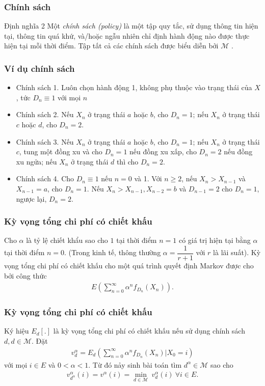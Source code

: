 \documentclass[12pt]{beamer}
\begin{document}
\begin{frame}
	\frametitle{Chính sách}
	\begin{block}{Định nghĩa 2}
		 Một \textit{chính sách (policy)} là một tập quy tắc, sử dụng thông tin hiện tại, thông tin quá khứ, và/hoặc ngẫu nhiên chỉ định hành động nào được thực hiện tại mỗi thời điểm. Tập tất cả các chính sách được biểu diễn bởi  $\mathcal{M}$ .
	\end{block}



\end{frame}

\begin{frame}
	\frametitle{Ví dụ chính sách}
	\begin{itemize}
	  \item	
		Chính sách 1. Luôn chọn hành động 1, không phụ thuộc vào trạng thái của $X$, tức $D_n \equiv 1$ với mọi $n$
		
  \item
		Chính sách 2. Nếu $X_n$ ở trạng thái $a$ hoặc $b$, cho $D_n=1$; nếu $X_n$ ở trạng thái $c$ hoặc $d$, cho $D_n=2$.
		
	  \item
		Chính sách 3. Nếu $X_n$ ở trạng thái $a$ hoặc $b$, cho $D_n=1$; nếu $X_n$ ở trạng thái $c$, tung một đồng xu và cho $D_n=1$ nếu đồng xu xấp, cho $D_n=2$ nếu đồng xu ngửa; nếu $X_n$ ở trạng thái $d$ thì cho $D_n=2$.
		
        \item
		Chính sách 4. Cho $D_n\equiv1$ nếu $n=0$ và 1. Với $n \geq 2$, nếu $X_{n}>X_{n-1}$ và $X_{n-1}=a$, cho $D_n=1$. Nếu $X_n>X_{n-1}, X_{n-2}=b$ và $D_{n-1}=2$ cho $D_n=1$, ngược lại, $D_n=2$.
	\end{itemize}
\end{frame}


\begin{frame}
	\frametitle{Kỳ vọng tổng chi phí có chiết khấu} 
	Cho $\alpha$ là tỷ lệ chiết khẩu sao cho $1$ tại thời điểm $n=1$ có giá trị hiện tại bằng $\alpha$ tại thời điểm $n=0$. (Trong kinh tế, thông thường $\alpha=\dfrac{1}{r+1}$ với $r$ là lãi suất). Kỳ vọng tổng chi phí có chiết khấu cho một quá trình quyết định Markov được cho bởi công thức 
	\begin{align*}
	E(\sum_{n=0}^{\infty}\alpha^n f_{D_n}(X_n)).
	\end{align*} 
\end{frame}

\begin{frame}
	\frametitle{Kỳ vọng tổng chi phí có chiết khấu} 
	 Ký hiệu $E_d[.]$ là kỳ vọng tổng chi phí có chiết khấu nếu sử dụng chính sách $d, d \in \mathcal{M}$. Đặt
	\begin{align*}
	v^{\alpha}_d= E_d(\sum_{n=0}^{\infty}\alpha^n f_{D_n}(X_n)|X_0=i)
	\end{align*} 
	với mọi $i \in E$ và $0<\alpha<1$. Từ đó nảy sinh bài toán tìm $d^{\alpha} \in \mathcal{M}$ sao cho
	\begin{align}
	v^{\alpha}_{d^\alpha}(i)=v^{\alpha}(i)=\underset{d \in \mathcal{M}}{\min} \ v^{\alpha}_d(i) \ \forall i\in E.  
	\end{align}
\end{frame}
\end{document}
